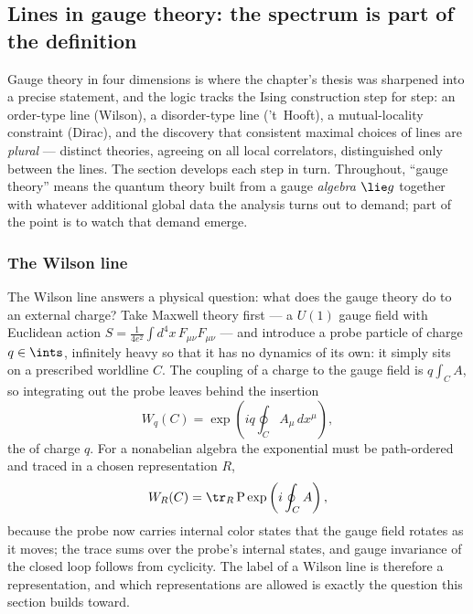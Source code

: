 \subsection{Lines in gauge theory: the spectrum is part of the definition}
\label{sec:gauge-lines}

Gauge theory in four dimensions is where the chapter's thesis was
sharpened into a precise statement, and the logic tracks the Ising
construction step for step: an order-type line (Wilson), a disorder-type
line ('t~Hooft), a mutual-locality constraint (Dirac), and the discovery
that consistent maximal choices of lines are \emph{plural} --- distinct
theories, agreeing on all local correlators, distinguished only between
the lines. The section develops each step in turn. Throughout, ``gauge
theory'' means the quantum theory built from a gauge \emph{algebra}
$\lie g$ together with whatever additional global data the analysis turns
out to demand; part of the point is to watch that demand emerge.

\subsubsection{The Wilson line}
\label{sec:wilson-line}

The Wilson line answers a physical question: what does the gauge theory
do to an external charge? Take Maxwell theory first --- a $U(1)$ gauge
field with Euclidean action $S = \frac{1}{4e^2}\int d^4x\,
F_{\mu\nu}F_{\mu\nu}$ --- and introduce a probe particle of charge $q
\in \ints$, infinitely heavy so that it has no dynamics of its own: it
simply sits on a prescribed worldline $C$. The coupling of a charge to
the gauge field is $q\int_C A$, so integrating out the probe leaves
behind the insertion
\begin{equation}
W_q(C) = \exp\left( i q \oint_C A_\mu\, dx^\mu \right),
\label{eq:wilson-u1}
\end{equation}
the  of charge $q$. For a nonabelian algebra the
exponential must be path-ordered and traced in a chosen representation
$R$,
\begin{equation}
W_R(C) = \tr_R\, \mathrm{P} \exp\left( i \oint_C A \right),
\label{eq:wilson-nonabelian}
\end{equation}
because the probe now carries internal color states that the gauge field
rotates as it moves; the trace sums over the probe's internal states,
and gauge invariance of the closed loop follows from cyclicity. The
label of a Wilson line is therefore a representation, and which
representations are allowed is exactly the question this section
builds toward.

